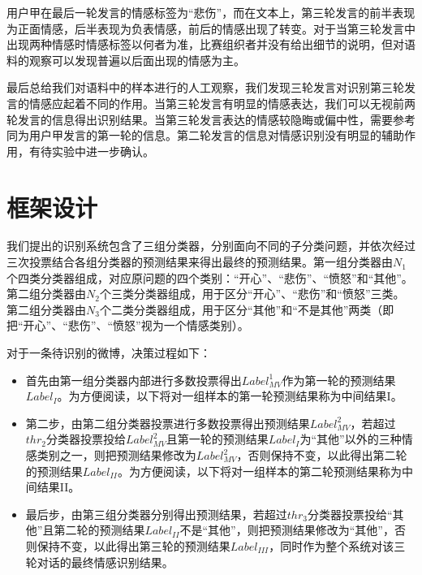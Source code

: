 用户甲在最后一轮发言的情感标签为“悲伤”，而在文本上，第三轮发言的前半表现为正面情感，后半表现为负表情感，前后的情感出现了转变。对于当第三轮发言中出现两种情感时情感标签以何者为准，比赛组织者并没有给出细节的说明，但对语料的观察可以发现普遍以后面出现的情感为主。

最后总给我们对语料中的样本进行的人工观察，我们发现三轮发言对识别第三轮发言的情感应起着不同的作用。当第三轮发言有明显的情感表达，我们可以无视前两轮发言的信息得出识别结果。当第三轮发言表达的情感较隐晦或偏中性，需要参考同为用户甲发言的第一轮的信息。第二轮发言的信息对情感识别没有明显的辅助作用，有待实验中进一步确认。

\section{框架设计}
\label{sec:exp_context_emo_framework}

我们提出的识别系统包含了三组分类器，分别面向不同的子分类问题，并依次经过三次投票结合各组分类器的预测结果来得出最终的预测结果。第一组分类器由$N_1$个四类分类器组成，对应原问题的四个类别：“开心”、“悲伤”、“愤怒”和“其他”。第二组分类器由$N_2$个三类分类器组成，用于区分“开心”、“悲伤”和“愤怒”三类。第二组分类器由$N_3$个二类分类器组成，用于区分“其他”和“不是其他”两类（即把“开心”、“悲伤”、“愤怒”视为一个情感类别）。

对于一条待识别的微博，决策过程如下：

\begin{itemize}

\item 首先由第一组分类器内部进行多数投票得出$Label^{1}_{MV}$作为第一轮的预测结果$Label_{I}$。为方便阅读，以下将对一组样本的第一轮预测结果称为中间结果I。

\item 第二步，由第二组分类器投票进行多数投票得出预测结果$Label^{2}_{MV}$，若超过$thr_{2}$分类器投票投给$Label^{2}_{MV}$且第一轮的预测结果$Label_{I}$为“其他”以外的三种情感类别之一，则把预测结果修改为$Label^{2}_{MV}$，否则保持不变，以此得出第二轮的预测结果$Label_{II}$。为方便阅读，以下将对一组样本的第二轮预测结果称为中间结果II。

\item 最后步，由第三组分类器分别得出预测结果，若超过$thr_{3}$分类器投票投给“其他”且第二轮的预测结果$Label_{II}$不是“其他”，则把预测结果修改为“其他”，否则保持不变，以此得出第三轮的预测结果$Label_{III}$，同时作为整个系统对该三轮对话的最终情感识别结果。

\end{itemize}

